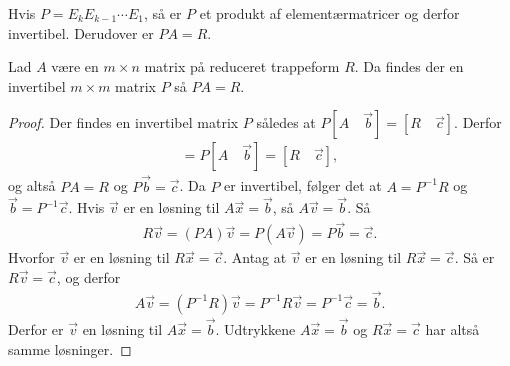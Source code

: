 Hvis $P = E_k E_{k-1} \dotsm E_1$, så er $P$ et produkt af elementærmatricer og derfor invertibel. Derudover er $PA = R$. 

\begin{stn}
Lad $A$ være en $m \times n$ matrix på reduceret trappeform $R$. Da findes der en invertibel $m \times m$ matrix $P$ så $PA=R$. 
\end{stn}

\begin{proof}
Der findes en invertibel matrix $P$ således at $P[A \quad \vec{b}] = [R \quad \vec{c}]$. Derfor
\begin{align*}
[PA \quad P\vec{b}] = P[A \quad \vec{b}] = [R \quad \vec{c}],
\end{align*}
og altså $PA = R$ og $P\vec{b}=\vec{c}$. Da $P$ er invertibel, følger det at $A = P^{-1}R$ og $\vec{b}=P^{-1}\vec{c}$.
Hvis $\vec{v}$ er en løsning til $A\vec{x}=\vec{b}$, så $A\vec{v}=\vec{b}$. Så
\begin{align*}
R\vec{v} = (PA)\vec{v} = P(A\vec{v}) = P\vec{b}=\vec{c}. 
\end{align*} 
Hvorfor $\vec{v}$ er en løsning til $R\vec{x}=\vec{c}$. Antag at $\vec{v}$ er en løsning til $R\vec{x} = \vec{c}$. Så er $R\vec{v} = \vec{c}$, og derfor
\begin{align*}
A\vec{v} = (P^{-1}R)\vec{v} = P^{-1}R\vec{v} = P^{-1}\vec{c} = \vec{b}. 
\end{align*}
Derfor er $\vec{v}$ en løsning til $A\vec{x} = \vec{b}$. Udtrykkene $A\vec{x} = \vec{b}$ og $R\vec{x} = \vec{c}$ har altså samme løsninger.
\end{proof}



